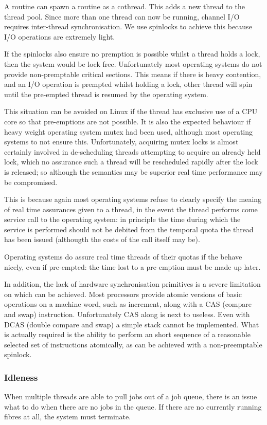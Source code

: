 \documentclass[oneside]{book}
\begin{document}
A routine can spawn a routine as a cothread. This adds a new thread
to the thread pool. Since more than one thread can now be running,
channel I/O requires inter-thread synchronisation. We use spinlocks
to achieve this because I/O operations are extremely light.

If the spinlocks also ensure no premption is possible whilst a thread
holds a lock, then the system would be lock free. Unfortunately most
operating systems do not provide non-premptable critical sections.
This means if there is heavy contention, and an I/O operation is prempted
whilst holding a lock, other thread will spin until the pre-empted thread
is resumed by the operating system.

This situation can be avoided on Linux if the thread has exclusive use
of a CPU core so that pre-emptions are not possible. It is also the
expected behaviour if heavy weight operating system mutex had been used,
although most operating systems to not ensure this. Unfortunately,
acquiring mutex locks is almost certainly involved in de-scheduling
threads attempting to acquire an already held lock, which no assurance
such a thread will be rescheduled rapidly after the lock is released;
so although the semantics may be superior real time performance
may be compromised.

This is because again most operating systems refuse to clearly specify
the meaing of real time assurances given to a thread, in the event
the thread performs come service call to the operating system: in principle
the time during which the service is performed should not be debited
from the temporal quota the thread has been issued (althougth the costs of
the call itself may be).

Operating systems do assure real time threads of their quotas if the
behave nicely, even if pre-empted: the time lost to a pre-emption
must be made up later. 

In addition, the lack of hardware synchronisation primitives is a severe
limitation on which can be achieved. Most processors provide atomic
versions of basic operations on a machine word, such as increment,
along with a CAS (compare and swap) instruction. Unfortunately CAS
along is next to useless. Even with DCAS (double compare and swap)
a simple stack cannot be implemented. What is actually required
is the ability to perform an short sequence of a reasonable selected
set of instructions atomically, as can be achieved with a non-preemptable
spinlock. 

\subsubsection{Idleness}
When multiple threads are able to pull jobs out of a job queue,
there is an issue what to do when there are no jobs in the queue.
If there are no currently running fibres at all, the system must
terminate.
\end{document}
